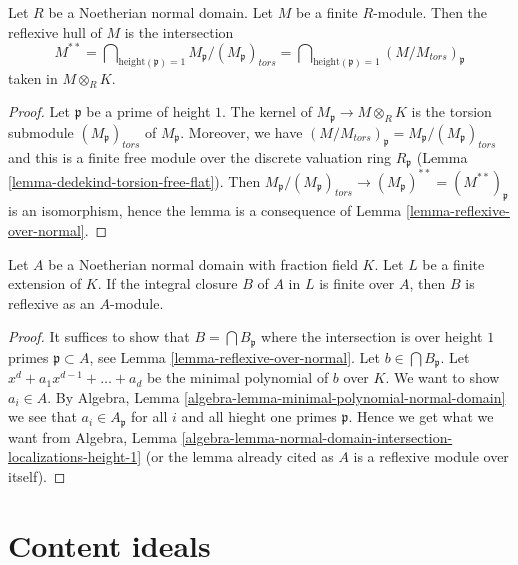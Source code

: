 \begin{lemma}
\label{lemma-describe-reflexive-hull}
Let $R$ be a Noetherian normal domain. Let $M$ be a finite $R$-module.
Then the reflexive hull of $M$ is the intersection
$$
M^{**} =
\bigcap\nolimits_{\text{height}(\mathfrak p) = 1}
M_{\mathfrak p}/(M_\mathfrak p)_{tors} =
\bigcap\nolimits_{\text{height}(\mathfrak p) = 1}
(M/M_{tors})_\mathfrak p
$$
taken in $M \otimes_R K$.
\end{lemma}

\begin{proof}
Let $\mathfrak p$ be a prime of height $1$.
The kernel of $M_\mathfrak p \to M \otimes_R K$ is the
torsion submodule $(M_\mathfrak p)_{tors}$ of $M_\mathfrak p$.
Moreover, we have
$(M/M_{tors})_\mathfrak p = M_\mathfrak p/(M_\mathfrak p)_{tors}$
and this is a finite free module over the discrete valuation ring
$R_\mathfrak p$
(Lemma \ref{lemma-dedekind-torsion-free-flat}).
Then $M_\mathfrak p/(M_\mathfrak p)_{tors} \to
(M_\mathfrak p)^{**} = (M^{**})_\mathfrak p$
is an isomorphism, hence the lemma is a consequence of
Lemma \ref{lemma-reflexive-over-normal}.
\end{proof}

\begin{lemma}
\label{lemma-integral-closure-reflexive}
Let $A$ be a Noetherian normal domain with fraction field $K$.
Let $L$ be a finite extension of $K$. If the integral closure
$B$ of $A$ in $L$ is finite over $A$, then $B$ is reflexive as an $A$-module.
\end{lemma}

\begin{proof}
It suffices to show that $B = \bigcap B_\mathfrak p$ where the intersection
is over height $1$ primes $\mathfrak p \subset A$, see
Lemma \ref{lemma-reflexive-over-normal}.
Let $b \in \bigcap B_\mathfrak p$. Let $x^d + a_1x^{d - 1} + \ldots + a_d$
be the minimal polynomial of $b$ over $K$.
We want to show $a_i \in A$.
By Algebra, Lemma \ref{algebra-lemma-minimal-polynomial-normal-domain}
we see that $a_i \in A_\mathfrak p$ for all $i$ and all hieght one primes
$\mathfrak p$. Hence we get what we want from
Algebra, Lemma
\ref{algebra-lemma-normal-domain-intersection-localizations-height-1}
(or the lemma already cited as $A$ is a reflexive module over itself).
\end{proof}








\section{Content ideals}
\label{section-content}

